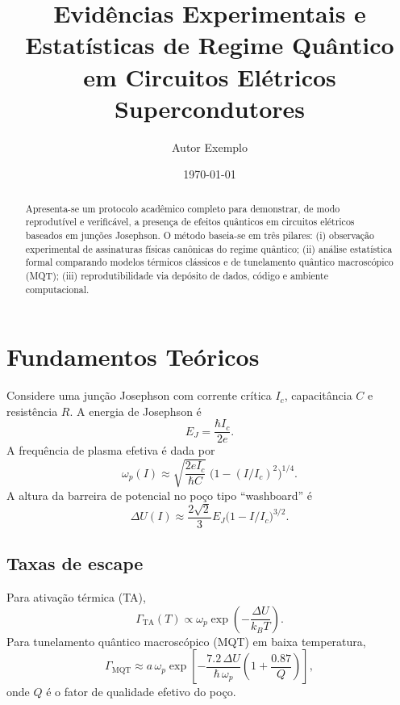 \documentclass[aps,prb,reprint,showpacs,superscriptaddress,longbibliography]{revtex4-2}
\begin{document}
\title{Evidências Experimentais e Estatísticas de Regime Quântico em Circuitos Elétricos Supercondutores}

\author{Autor Exemplo}
\date{\today}

\begin{abstract}
Apresenta-se um protocolo acadêmico completo para demonstrar, de modo reprodutível e verificável, a presença de efeitos quânticos em circuitos elétricos baseados em junções Josephson. O método baseia-se em três pilares: (i) observação experimental de assinaturas físicas canônicas do regime quântico; (ii) análise estatística formal comparando modelos térmicos clássicos e de tunelamento quântico macroscópico (MQT); (iii) reprodutibilidade via depósito de dados, código e ambiente computacional.
\end{abstract}

\maketitle

\section{Fundamentos Teóricos}

Considere uma junção Josephson com corrente crítica $I_c$, capacitância $C$ e resistência $R$. A energia de Josephson é
\begin{equation}
E_J = \frac{\hbar I_c}{2e}.
\end{equation}
A frequência de plasma efetiva é dada por
\begin{equation}
\omega_p(I) \approx \sqrt{\frac{2e I_c}{\hbar C}}\;\bigl(1 - (I/I_c)^2\bigr)^{1/4}.
\end{equation}
A altura da barreira de potencial no poço tipo ``washboard'' é
\begin{equation}
\Delta U(I) \approx \frac{2\sqrt{2}}{3} E_J \bigl(1 - I/I_c \bigr)^{3/2}.
\end{equation}

\subsection{Taxas de escape}

Para ativação térmica (TA),
\begin{equation}
\Gamma_{\mathrm{TA}}(T) \propto \omega_p \exp\left(-\frac{\Delta U}{k_BT}\right).
\end{equation}
Para tunelamento quântico macroscópico (MQT) em baixa temperatura,
\begin{equation}
\Gamma_{\mathrm{MQT}} \approx a\,\omega_p \exp\left[-\frac{7.2\,\Delta U}{\hbar\,\omega_p}\left(1+\frac{0.87}{Q}\right)\right],
\end{equation}
onde $Q$ é o fator de qualidade efetivo do poço.
\end{document}
